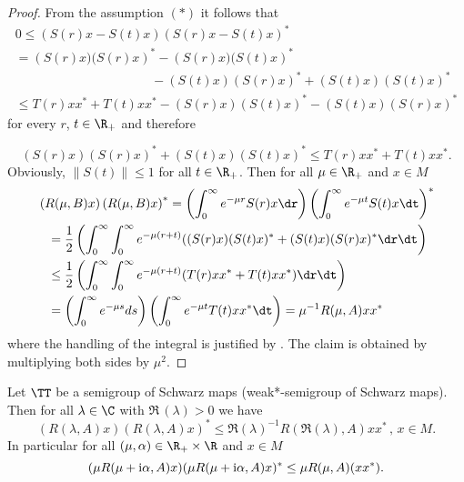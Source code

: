 \begin{proof}
From the assumption $ (*) $ it follows that
\begin{multline*}
	0 	 \leq \left( S(r)x - S(t)x \right) \left( S(r)x - S(t)x \right)^{*} {} \\
		  = \left( S(r)x)(S(r)x \right)^{*} - \left( S(r)x)(S(t)x \right)^{*} \\
		 \phantom{(S(r)x)(S(r)x)^{*}} - (S(t)x)(S(r)x)^{*} + (S(t)x)(S(t)x)^{*}  \\
		\leq T(r)xx^{*} + T(t)xx^{*}   - (S(r)x)(S(t)x)^{*} -  
		   (S(t)x)(S(r)x)^{*}
\end{multline*}
for every $ r $, $ t \in \R_{+} $ and therefore

\[
	(S(r)x)(S(r)x)^{*} + (S(t)x)(S(t)x)^{*} \leq T(r)xx^{*} + T(t)xx^{*} .
\]
Obviously, $ \| S(t)\| \leq 1 $ for all $ t \in \R_{+} $.
Then for all $ \mu \in \R_{+} $ and $ x \in M $
\begin{align*}
	 {}& \left( R(\mu,B)x  \right) \left( R(\mu,B)x \right)^{*} 
		= \left( \int_{0}^\infty e^{-\mu r}S(r)x \dr \right)
			\left( \int_{0}^\infty e^{-\mu t}S(t)x \dt \right)^{*}   \\
	&\phantom{=}= \frac{1}{2} \left( \int_{0}^\infty \int_{0}^\infty e^{-\mu(r+t)} ((S(r)x)(S(t)x)^{*}  
			+ (S(t)x)(S(r)x)^{*}  \dr \dt \right) \\
	&\phantom{=}\leq \frac{1}{2} \left(\int_{0}^\infty \int_{0}^\infty e^{-\mu(r+t)} (T(r)xx^{*} + T(t)xx^{*})  			\dr \dt \right)\\
	&\phantom{=}= \left( \int_{0}^\infty e^{-\mu s} ds \right)
			\left( \int_{0}^\infty e^{-\mu t}T(t)xx^{*} \dt \right) 
				= \mu^{-1}R(\mu,A)xx^{*}
\end{align*}
where the handling of the integral is justified by \citet[Chap. V, §8, n° 4, Proposition 9]{bourbaki:1955}.
The claim is obtained by multiplying both sides by $\mu^{2} $. 
\end{proof}
\begin{corollary}\label{cor:d1-2.2}
Let $ \TT $ be a semigroup of Schwarz maps (\resp weak*-semigroup of Schwarz maps).
Then for all $ \lambda \in \C $ with $ \Re \, (\lambda) > 0 $ we have
\[
	\left( R(\lambda,A)x \right) \left( R(\lambda,A)x \right)^{*} 
		\leq \Re(\lambda)^{-1} R(\Re(\lambda),A)xx^{*} \, , \, x \in M .
\]
In particular for all $ (\mu,\alpha) \in \R_{+} \times \R $ and $ x \in M $
\[
(\mu R(\mu+\mathrm{i} \alpha,A)x)(\mu R(\mu + \mathrm{i} \alpha,A)x)^{*} \leq \mu R(\mu,A)(xx^{*}).
\]
\end{corollary}
